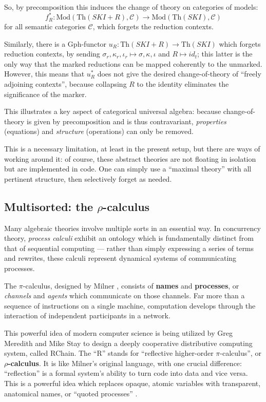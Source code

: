 \documentclass{amsart}
\theoremstyle{definition}
\newcommand{\Th}{\mathrm{Th}}
\newcommand{\Gph}{\mathrm{Gph}}
\newcommand{\Mod}{\mathrm{Mod}}
\newcommand{\C}{\mathscr{C}}
\newcommand{\maps}{\colon}
\begin{document}
So, by precomposition this induces the change of theory on categories of models: $$f_R^*\maps \Mod(\Th(SKI+R),\C) \to \Mod(\Th(SKI),\C)$$ for all semantic categories $\C$, which forgets the reduction contexts.

Similarly, there is a $\Gph$-functor $u_R\maps \Th(SKI+R)\to \Th(SKI)$ which forgets reduction contexts, by sending $\sigma_r,\kappa_r,\iota_r \mapsto\sigma, \kappa,\iota$ and $R \mapsto id_t$; this latter is the only way that the marked reductions can be mapped coherently to the unmarked. However, this means that $u_R^*$ does not give the desired change-of-theory of ``freely adjoining contexts'', because collapsing $R$ to the identity eliminates the significance of the marker.

This illustrates a key aspect of categorical universal algebra: because change-of-theory is given by precomposition and is thus contravariant, \textit{properties} (equations) and \textit{structure} (operations) can only be removed.

This is a necessary limitation, at least in the present setup, but there are ways of working around it: of course, these abstract theories are not floating in isolation but are implemented in code. One can simply use a ``maximal theory'' with all pertinent structure, then selectively forget as needed.

\subsection{Multisorted: the $\rho$-calculus}

Many algebraic theories involve multiple sorts in an essential way. In concurrency theory, \textit{process calculi} exhibit an ontology which is fundamentally distinct from that of sequential computing --- rather than simply expressing a series of terms and rewrites, these calculi represent dynamical systems of communicating processes.

The $\pi$-calculus, designed by Milner \cite{milner}, consists of \textbf{names} and \textbf{processes}, or \textit{channels} and \textit{agents} which communicate on those channels. Far more than a sequence of instructions on a single machine, computation develops through the interaction of independent participants in a network.

This powerful idea of modern computer science is being utilized by Greg Meredith and Mike Stay to design a deeply cooperative distributive computing system, called RChain. The ``R'' stands for ``reflective higher-order $\pi$-calculus'', or \textbf{$\rho$-calculus}. It is like Milner's original language, with one crucial difference: ``reflection'' is a formal system's ability to turn code into data and vice versa. This is a powerful idea which replaces opaque, atomic variables with transparent, anatomical names, or ``quoted processes'' \cite{refl}.
\end{document}
